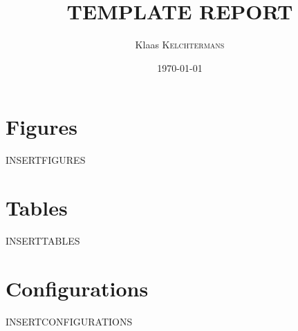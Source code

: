 \documentclass{article}
\title{TEMPLATE REPORT} %
\author{Klaas \textsc{Kelchtermans}} %
\date{\today} %
\begin{document}
\maketitle %



\section{Figures}

INSERTFIGURES


\section{Tables}

INSERTTABLES


\section{Configurations}

INSERTCONFIGURATIONS
\end{document}

